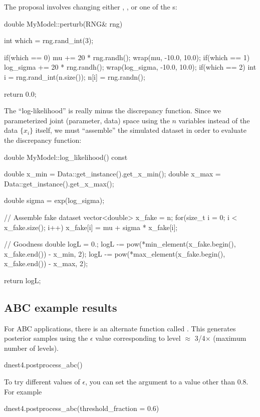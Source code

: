 \documentclass[article, nojss]{jss}
\begin{document}
The proposal involves changing either , , or
one of the s:
\begin{CodeChunk}
\begin{CodeInput}
double MyModel::perturb(RNG& rng)
{
    int which = rng.rand_int(3);

    if(which == 0)
    {
        mu += 20 * rng.randh();
        wrap(mu, -10.0, 10.0);
    }
    if(which == 1)
    {
        log_sigma += 20 * rng.randh();
        wrap(log_sigma, -10.0, 10.0);
    }
    if(which == 2)
    {
        int i = rng.rand_int(n.size());
        n[i] = rng.randn();
    }

    return 0.0;
}
\end{CodeInput}
\end{CodeChunk}

The ``log-likelihood'' is really minus the discrepancy function.
Since we parameterized joint (parameter, data) space using the
$n$ variables instead of the data $\{x_i\}$ itself, we must
``assemble'' the simulated dataset in order to evaluate the
discrepancy function:
\begin{CodeChunk}
\begin{CodeInput}
double MyModel::log_likelihood() const
{
    double x_min = Data::get_instance().get_x_min();
    double x_max = Data::get_instance().get_x_max();

    double sigma = exp(log_sigma);

    // Assemble fake dataset
    vector<double> x_fake = n;
    for(size_t i = 0; i < x_fake.size(); i++)
        x_fake[i] = mu + sigma * x_fake[i];

    // Goodness
    double logL = 0.;
    logL -= pow(*min_element(x_fake.begin(), x_fake.end()) - x_min, 2);
    logL -= pow(*max_element(x_fake.begin(), x_fake.end()) - x_max, 2);

    return logL;
}
\end{CodeInput}
\end{CodeChunk}

\subsection{ABC example results}
For ABC applications, there is an alternate  function
called .
This generates posterior samples using the $\epsilon$ value corresponding
to level $\approx$ 3/4$\times$ (maximum number of levels).
\begin{CodeChunk}
\begin{CodeInput}
dnest4.postprocess_abc()
\end{CodeInput}
\end{CodeChunk}
To try different values of $\epsilon$, you can set the argument
 to a value other than 0.8. For example
\begin{CodeChunk}
\begin{CodeInput}
dnest4.postprocess_abc(threshold_fraction = 0.6)
\end{CodeInput}
\end{CodeChunk}
\end{document}
